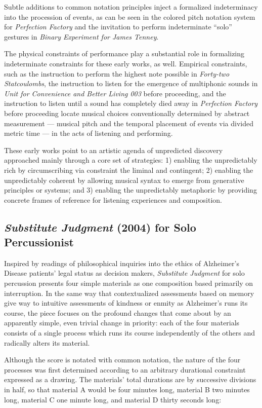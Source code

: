Subtle additions to common notation principles inject a formalized indeterminacy into the procession of events, as can be seen in the colored pitch notation system for \emph{Perfection Factory} and the invitation to perform indeterminate ``solo'' gestures in \emph{Binary Experiment for James Tenney}. 

The physical constraints of performance play a substantial role in formalizing indeterminate constraints for these early works, as well. Empirical constraints, such as the instruction to perform the highest note possible in \emph{Forty-two Statcoulombs}, the instruction to listen for the emergence of multiphonic sounds in \emph{Unit for Convenience and Better Living 003} before proceeding, and the instruction to listen until a sound has completely died away in \emph{Perfection Factory} before proceeding locate musical choices conventionally determined by abstract measurement --- musical pitch and the temporal placement of events via divided metric time --- in the acts of listening and performing. 

These early works point to an artistic agenda of unpredicted discovery approached mainly through a core set of strategies: 1) enabling the unpredictably rich by circumscribing via constraint the liminal and contingent; 2) enabling the unpredictably coherent by allowing musical syntax to emerge from generative principles or systems; and 3) enabling the unpredictably metaphoric by providing concrete frames of reference for listening experiences and composition.

\subsection{\emph{Substitute Judgment} (2004) for Solo Percussionist}

Inspired by readings of philosophical inquiries into the ethics of Alzheimer’s Disease patients’ legal status as decision makers, \emph{Substitute Judgment} for solo percussion presents four simple materials as one composition based primarily on interruption. In the same way that contextualized assessments based on memory give way to intuitive assessments of kindness or enmity as Alzheimer's runs its course, the piece focuses on the profound changes that come about by an apparently simple, even trivial change in priority: each of the four materials consists of a single process which runs its course independently of the others and radically alters its material.

Although the score is notated with common notation, the nature of the four processes was first determined according to an arbitrary durational constraint expressed as a drawing. The materials' total durations are by successive divisions in half, so that material A would be four minutes long, material B two minutes long, material C one minute long, and material D thirty seconds long:

